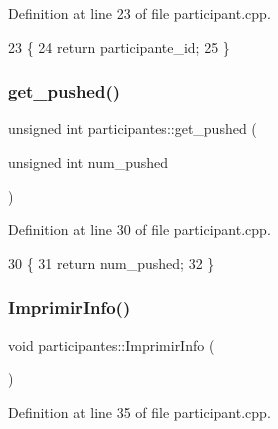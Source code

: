Definition at line 23 of file participant.\+cpp.


\begin{DoxyCode}
23                                                                               \{
24     \textcolor{keywordflow}{return} participante\_id;
25 \}
\end{DoxyCode}
\mbox{\label{classparticipantes_ae38b0ef6e201f1310a810467aba88649}} 
\subsubsection{\texorpdfstring{get\+\_\+pushed()}{get\_pushed()}}
{\footnotesize\ttfamily unsigned int participantes\+::get\+\_\+pushed (\begin{DoxyParamCaption}\item[{unsigned int}]{num\+\_\+pushed }\end{DoxyParamCaption})}



Definition at line 30 of file participant.\+cpp.


\begin{DoxyCode}
30                                                                \{
31     \textcolor{keywordflow}{return} num\_pushed;
32 \}
\end{DoxyCode}
\mbox{\label{classparticipantes_a2177447cffbb9d2b2074dcc0e7d09f3f}} 
\subsubsection{\texorpdfstring{Imprimir\+Info()}{ImprimirInfo()}}
{\footnotesize\ttfamily void participantes\+::\+Imprimir\+Info (\begin{DoxyParamCaption}{ }\end{DoxyParamCaption})}



Definition at line 35 of file participant.\+cpp.


